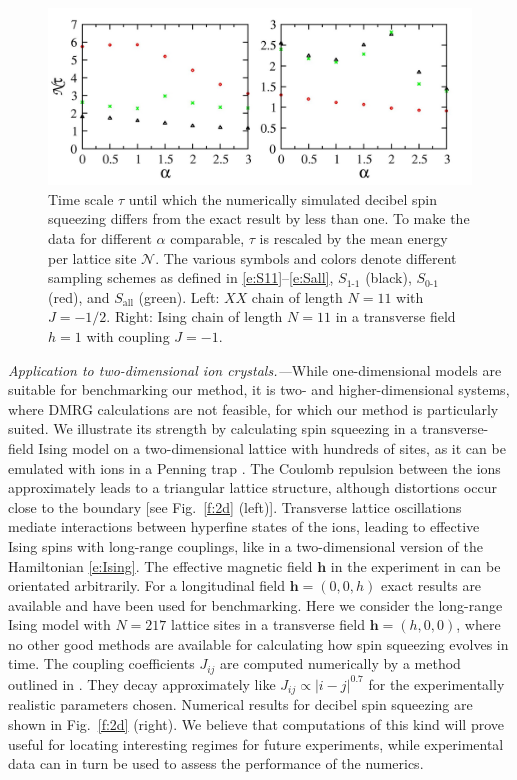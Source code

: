 \documentclass[aps,prl,showpacs,amsmath,amssymb,superscriptaddress,reprint,10pt]{revtex4-1}
\newcommand{\mvec}[1]{\boldsymbol #1}
\begin{document}
\begin{bibunit}
\begin{figure}\centering
\includegraphics[width=\linewidth]{./Compare_XY_tau_alpha_N11_dtwa2o_ED_rescaled.jpg}
\caption{\label{f:alpha_dependence}%
Time scale $\tau$ until which the numerically simulated decibel spin squeezing differs from the exact result by less than one. To make the data for different $\alpha$ comparable, $\tau$ is rescaled by the mean energy per lattice site $\mathscr{N}$. The various symbols and colors denote different sampling schemes as defined in \eqref{e:S11}--\eqref{e:Sall}, $S_{\text{1-1}}$ (black), $S_{\text{0-1}}$ (red), and $S_{\text{all}}$ (green). Left: $XX$ chain of length $N=11$ with $J=-1/2$. Right: Ising chain of length $N=11$ in a transverse field $h=1$ with coupling $J=-1$.
}%
\end{figure}


{\em Application to two-dimensional ion crystals.---}While one-dimensional models are suitable for benchmarking our method, it is two- and higher-dimensional systems, where DMRG calculations are not feasible, for which our method is particularly suited. We illustrate its strength by calculating spin squeezing in a transverse-field Ising model on a two-dimensional lattice with hundreds of sites, as it can be emulated with ions in a Penning trap \cite{Britton_etal12}. The Coulomb repulsion between the ions approximately leads to a triangular lattice structure, although distortions occur close to the boundary [see Fig.~\ref{f:2d} (left)]. Transverse lattice oscillations mediate interactions between hyperfine states of the ions, leading to effective Ising spins with long-range couplings, like in a two-dimensional version of the Hamiltonian \eqref{e:Ising}. The effective magnetic field $\mvec{h}$ in the experiment in \cite{Britton_etal12} can be orientated arbitrarily. For a longitudinal field $\mvec{h}=(0,0,h)$ exact results are available 
and have been used for benchmarking. Here we consider the long-range Ising model with $N=217$ lattice sites in a transverse field $\mvec{h}=(h,0,0)$, where no other good methods are available for calculating how spin squeezing evolves in time. The coupling coefficients $J_{ij}$ are computed numerically by a method outlined in \cite{Britton_etal12}. They decay approximately like $J_{ij}\propto|i-j|^{0.7}$ for the experimentally realistic parameters chosen. Numerical results for decibel spin squeezing are shown in Fig.~\ref{f:2d} (right). We believe that computations of this kind will prove useful for locating interesting regimes for future experiments, while experimental data can in turn be used to assess the performance of the numerics.



\end{bibunit}
\end{document}
